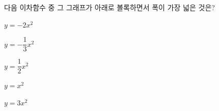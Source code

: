 다음 이차함수 중 그 그래프가 아래로 볼록하면서 폭이 가장 넓은 것은?
\begin{choices32}{\rule[-3ex]{0pt}{8ex}$y=-2x^2$}{\rule[-3ex]{0pt}{8ex}$y=-\dfrac{1}{3}x^2$}{\rule[-3ex]{0pt}{8ex}$y=\dfrac{1}{2}x^2$}{\rule[-3ex]{0pt}{8ex}$y=x^2$}{\rule[-3ex]{0pt}{8ex}$y=3x^2$}\end{choices32}
